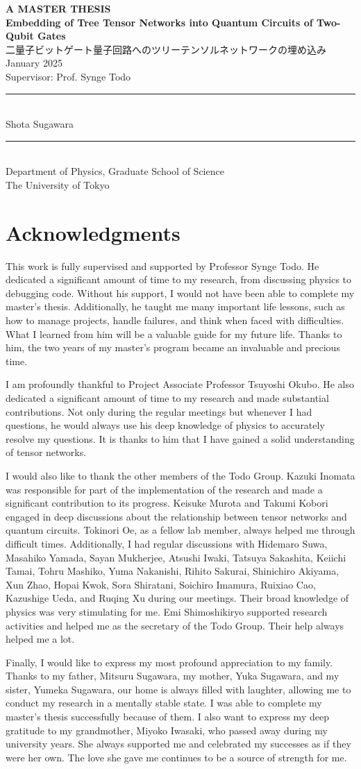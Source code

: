 \documentclass[12pt,dvipdfmx,twoside,openright]{report}
\renewcommand{\maketitle}{
    \begin{center}
        \vspace*{2cm}
        {\LARGE \textbf{A MASTER THESIS}} \\[2cm]  %
        {\Huge \textbf{Embedding of Tree Tensor Networks into Quantum Circuits of Two-Qubit
Gates}} \\[0.5cm]  %
        {\Large 二量子ビットゲート量子回路へのツリーテンソルネットワークの埋め込み} \\[2cm]  %
        {\small January 2025} \\[1cm]  %
        {\large Supervisor: Prof. Synge Todo} \\[2cm]  %
        \rule[0.5ex]{10cm}{1pt} \\  %
        {\large Shota Sugawara} \\ %
        \rule[0.5ex]{10cm}{1pt} \\[1cm]  %
        {\large Department of Physics, Graduate School of Science \\ The University of Tokyo}  %
    \end{center}
    \thispagestyle{empty} 
}
\begin{document}
\maketitle


\cleardoublepage
\chapter*{Acknowledgments}
\thispagestyle{empty} 
This work is fully supervised and supported by Professor Synge Todo.
He dedicated a significant amount of time to my research, from discussing physics to debugging code.
Without his support, I would not have been able to complete my master's thesis.
Additionally, he taught me many important life lessons, such as how to manage projects, handle failures, and think when faced with difficulties.
What I learned from him will be a valuable guide for my future life.
Thanks to him, the two years of my master's program became an invaluable and precious time.

I am profoundly thankful to Project Associate Professor Tsuyoshi Okubo.
He also dedicated a significant amount of time to my research and made substantial contributions. 
Not only during the regular meetings but whenever I had questions, he would always use his deep knowledge of physics to accurately resolve my questions. 
It is thanks to him that I have gained a solid understanding of tensor networks.

I would also like to thank the other members of the Todo Group. 
Kazuki Inomata was responsible for part of the implementation of the research and made a significant contribution to its progress. 
Keisuke Murota and Takumi Kobori engaged in deep discussions about the relationship between tensor networks and quantum circuits. 
Tokinori Oe, as a fellow lab member, always helped me through difficult times. Additionally, I had regular discussions with Hidemaro Suwa, Masahiko Yamada, Sayan Mukherjee, Atsushi Iwaki, Tatsuya Sakashita, Keiichi Tamai, Tohru Mashiko, Yuma Nakanishi, Rihito Sakurai, Shinichiro Akiyama, Xun Zhao, Hopai Kwok, Sora Shiratani, Soichiro Imamura, Ruixiao Cao, Kazushige Ueda, and Ruqing Xu during our meetings. Their broad knowledge of physics was very stimulating for me. 
Emi Shimoshikiryo supported research activities and helped me as the secretary of the Todo Group. 
Their help always helped me a lot.

Finally, I would like to express my most profound appreciation to my family.
Thanks to my father, Mitsuru Sugawara, my mother, Yuka Sugawara, and my sister, Yumeka Sugawara, our home is always filled with laughter, allowing me to conduct my research in a mentally stable state. 
I was able to complete my master's thesis successfully because of them. 
I also want to express my deep gratitude to my grandmother, Miyoko Iwasaki, who passed away during my university years. 
She always supported me and celebrated my successes as if they were her own. 
The love she gave me continues to be a source of strength for me.
\end{document}
